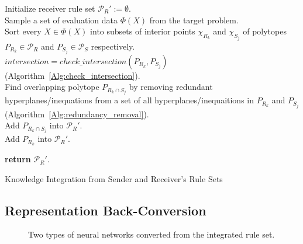\documentclass[lettersize,journal]{IEEEtran}
\begin{document}
\begin{algorithm}[!htb]
\footnotesize
{}

Initialize receiver rule set $\mathcal{P}_R' := \emptyset$. \\
Sample a set of evaluation data $\Phi(X)$ from the target problem. \\
Sort every $X \in \Phi(X)$ into subsets of interior points $\chi_{R_k}$ and $\chi_{S_j}$ of polytopes $P_{R_k} \in \mathcal{P}_R$ and $P_{S_j} \in \mathcal{P}_S$ respectively. \\

{
	{
        {
    		$intersection=check\_intersection (P_{R_k},P_{S_j})$ (Algorithm~\ref{Alg:check_intersection}). \\
    		{
    			Find overlapping polytope $P_{R_k \cap S_j}$ by removing redundant hyperplanes/inequations from a set of all hyperplanes/inequaitions in $P_{R_k}$ and $P_{S_j}$ (Algorithm~\ref{Alg:redundancy_removal}).\\
    			Add $P_{R_k \cap S_j}$ into $\mathcal{P}_R'$.\\
    		}
    		\Else
    		{
    		    Add $P_{R_k}$ into $\mathcal{P}_R'$.\\
    		}
	    }
	}
}

\textbf{return} $\mathcal{P}_R'$.
\caption{Knowledge Integration from Sender and Receiver\textquoteright s Rule Sets}\label{Alg:knowledge-sharing-NNs}
\end{algorithm}


\subsection{Representation Back-Conversion}\label{jpaper2-methodology-fusion-integration}

\begin{figure}[!htb]
\centering
    \hspace{1em}
    \caption{Two types of neural networks converted from the integrated rule set.}%
\label{fig:two-types-NN}
\end{figure}
\end{document}
